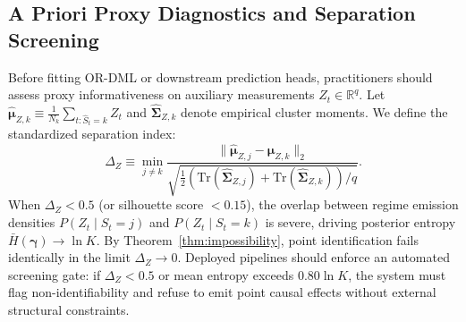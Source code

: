 \documentclass[twoside]{article}
\theoremstyle{definition}
\newcommand{\R}{\mathbb{R}}
\begin{document}
\subsection{A Priori Proxy Diagnostics and Separation Screening}
\label{app:proxy_diagnostics}
Before fitting OR-DML or downstream prediction heads, practitioners should assess proxy informativeness on auxiliary measurements $Z_t \in \R^q$. Let $\hat{\boldsymbol{\mu}}_{Z,k} \equiv \frac{1}{N_k}\sum_{t: \hat{S}_t=k} Z_t$ and $\hat{\boldsymbol{\Sigma}}_{Z,k}$ denote empirical cluster moments. We define the standardized separation index:
\begin{equation}
    \Delta_Z \equiv \min_{j \neq k} \frac{\|\hat{\boldsymbol{\mu}}_{Z,j} - \hat{\boldsymbol{\mu}}_{Z,k}\|_2}{\sqrt{\frac{1}{2}(\mathrm{Tr}(\hat{\boldsymbol{\Sigma}}_{Z,j}) + \mathrm{Tr}(\hat{\boldsymbol{\Sigma}}_{Z,k}))/q}}.
\end{equation}
When $\Delta_Z < 0.5$ (or silhouette score $< 0.15$), the overlap between regime emission densities $P(Z_t \mid S_t=j)$ and $P(Z_t \mid S_t=k)$ is severe, driving posterior entropy $\bar{H}(\boldsymbol{\gamma}) \to \ln K$. By Theorem~\ref{thm:impossibility}, point identification fails identically in the limit $\Delta_Z \to 0$. Deployed pipelines should enforce an automated screening gate: if $\Delta_Z < 0.5$ or mean entropy exceeds $0.80 \ln K$, the system must flag non-identifiability and refuse to emit point causal effects without external structural constraints.

\vspace{-2mm}
\end{document}
